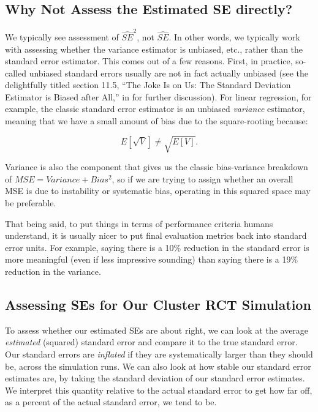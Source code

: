 \documentclass[
]{book}
\begin{document}
\subsection{Why Not Assess the Estimated SE directly?}\label{why-not-assess-the-estimated-se-directly}

We typically see assessment of \(\widehat{SE}^2\), not \(\widehat{SE}\).
In other words, we typically work with assessing whether the variance estimator is unbiased, etc., rather than the standard error estimator.
This comes out of a few reasons.
First, in practice, so-called unbiased standard errors usually are not in fact actually unbiased (see the delightfully titled section 11.5, ``The Joke Is on Us: The Standard Deviation Estimator is Biased after All,'' in \citet{westfall2013understanding} for further discussion).
For linear regression, for example, the classic standard error estimator is an unbiased \emph{variance} estimator, meaning that we have a small amount of bias due to the square-rooting because:

\[ E[ \sqrt{ V } ] \neq \sqrt{ E[ V ] } . \]

Variance is also the component that gives us the classic bias-variance breakdown of \(MSE = Variance + Bias^2\), so if we are trying to assign whether an overall MSE is due to instability or systematic bias, operating in this squared space may be preferable.

That being said, to put things in terms of performance criteria humans understand, it is usually nicer to put final evaluation metrics back into standard error units.
For example, saying there is a 10\% reduction in the standard error is more meaningful (even if less impressive sounding) than saying there is a 19\% reduction in the variance.

\subsection{Assessing SEs for Our Cluster RCT Simulation}\label{assessing-ses-for-our-cluster-rct-simulation}

To assess whether our estimated SEs are about right, we can look at the average \emph{estimated} (squared) standard error and compare it to the true standard error.
Our standard errors are \emph{inflated} if they are systematically larger than they should be, across the simulation runs.
We can also look at how stable our standard error estimates are, by taking the standard deviation of our standard error estimates.
We interpret this quantity relative to the actual standard error to get how far off, as a percent of the actual standard error, we tend to be.
\end{document}
